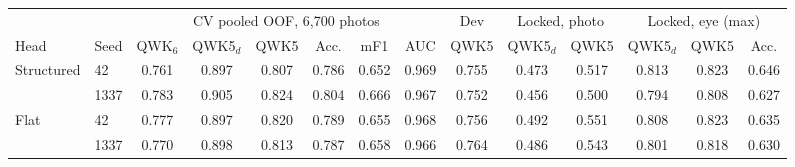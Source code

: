 \begin{tabular}{@{}ll@{\hspace{4pt}}cccccc@{\hspace{5pt}}c@{\hspace{5pt}}cc@{\hspace{5pt}}ccc@{}}
\toprule
 & & \multicolumn{6}{c}{CV pooled OOF, 6{,}700 photos} & Dev & \multicolumn{2}{c}{Locked, photo} & \multicolumn{3}{c}{Locked, eye (max)}\\
\cmidrule(lr){3-8}\cmidrule(lr){9-9}\cmidrule(lr){10-11}\cmidrule(l){12-14}
Head & Seed & QWK$_6$ & QWK5$_d$ & QWK5 & Acc. & mF1 & AUC & QWK5 & QWK5$_d$ & QWK5 & QWK5$_d$ & QWK5 & Acc.\\
\midrule
Structured & 42 & 0.761 & 0.897 & 0.807 & 0.786 & 0.652 & 0.969 & 0.755 & 0.473 & 0.517 & 0.813 & 0.823 & 0.646 \\
 & 1337 & 0.783 & 0.905 & 0.824 & 0.804 & 0.666 & 0.967 & 0.752 & 0.456 & 0.500 & 0.794 & 0.808 & 0.627 \\
Flat & 42 & 0.777 & 0.897 & 0.820 & 0.789 & 0.655 & 0.968 & 0.756 & 0.492 & 0.551 & 0.808 & 0.823 & 0.635 \\
 & 1337 & 0.770 & 0.898 & 0.813 & 0.787 & 0.658 & 0.966 & 0.764 & 0.486 & 0.543 & 0.801 & 0.818 & 0.630 \\
\bottomrule
\end{tabular}
